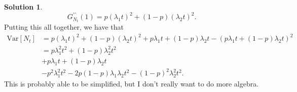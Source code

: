 \documentclass[12pt]{article}
\newcommand{\Var}{\text{Var}}
\theoremstyle{definition}
\newtheorem{sol}{Solution}
\theoremstyle{remark}
\begin{document}
\begin{sol}
\begin{equation*}
        G_{N_{t}}^{\prime \prime}(1) = p (\lambda_{1} t)^{2} + (1-p) (\lambda_{2} t)^{2}.
    \end{equation*}
    Putting this all together, we have that
    \begin{align*}
        \Var[N_{t}] &= p (\lambda_{1} t)^{2} + (1-p) (\lambda_{2} t)^{2} + p \lambda_{1} t + (1-p) \lambda_{2}t - (p \lambda_{1} t + (1-p) \lambda_{2}t)^{2}\\
                    &= p \lambda_{1}^{2} t^{2} + (1-p)\lambda_{2}^{2}t^{2}\\
                    &+ p \lambda_{1} t + (1-p) \lambda_{2}t\\ 
                    &- p^{2} \lambda_{1}^{2}t^{2} - 2p(1-p) \lambda_{1}\lambda_{2} t^{2}  - (1-p)^{2}\lambda_{2}^{2} t^{2}.
    \end{align*}
    This is probably able to be simplified, but I don't really want to do more algebra. 
\end{sol}
\end{document}
